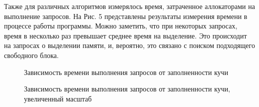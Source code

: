    Также для различных алгоритмов измерялось время, затраченное аллокаторами на выполнение запросов. На Рис. 5 представлены результаты измерения времени в процессе
   работы программы. Можно заметить, что при некоторых запросах, время в несколько раз превышает среднее время на выделение. Это происходит на запросах о 
   выделении памяти, и, вероятно, это связано с поиском подходящего свободного блока. 
   
   \begin{figure}[p]
   \caption{Зависимость времени выполнения запросов от заполненности кучи}
   \label{ris:image}
   \end{figure}
   
   \begin{figure}[p]
   \caption{Зависимость времени выполнения запросов от заполненности кучи, увеличенный масштаб}
   \label{ris:image}
   \end{figure}
   
